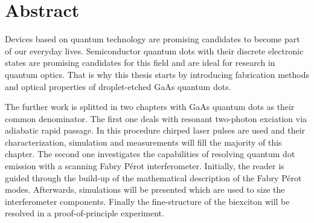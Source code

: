 

\chapter*{Abstract}
\label{cha:abstract}


Devices based on quantum technology are promising candidates to become part of our everyday lives.
Semiconductor quantum dots with their discrete electronic states are promising candidates for this field and are ideal for research in quantum optics.
That is why this thesis starts by introducing fabrication methods and optical properties of droplet-etched GaAs quantum dots.

The further work is splitted in two chapters with GaAs quantum dots as their common denominator.
The first one deals with resonant two-photon exciation via adiabatic rapid passage.
In this procedure chirped laser pulses are used and their characterization, simulation and measurements will fill the majority of this chapter.
The second one investigates the capabilities of resolving quantum dot emission with a scanning Fabry Pérot interferometer.
Initially, the reader is guided through the build-up of the mathematical description of the Fabry Pérot modes.
Afterwards, simulations will be presented which are used to size the interferometer components.
Finally the fine-structure of the biexciton will be resolved in a proof-of-principle experiment. 


